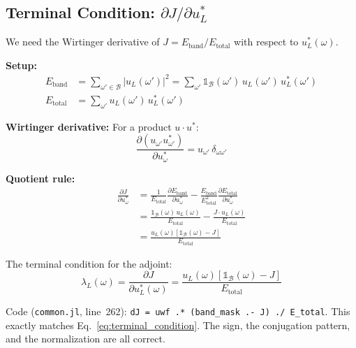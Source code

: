 \documentclass[12pt,a4paper]{article}
\newcommand{\pdv}[2]{\frac{\partial #1}{\partial #2}}
\theoremstyle{definition}
\begin{document}
\subsection{Terminal Condition: $\partial J / \partial u_L^*$}
\label{sec:terminal}

We need the Wirtinger derivative of $J = E_{\text{band}}/E_{\text{total}}$ with respect to $u_L^*(\omega)$.

\textbf{Setup:}
\begin{align}
E_{\text{band}} &= \sum_{\omega' \in \mathcal{B}} |u_L(\omega')|^2 = \sum_{\omega'} \mathbb{1}_\mathcal{B}(\omega')\, u_L(\omega')\, u_L^*(\omega') \\
E_{\text{total}} &= \sum_{\omega'} u_L(\omega')\, u_L^*(\omega')
\end{align}

\textbf{Wirtinger derivative:} For a product $u \cdot u^*$:
\begin{equation}
\pdv{(u_{\omega'}u_{\omega'}^*)}{u_\omega^*} = u_{\omega'}\,\delta_{\omega\omega'}
\end{equation}

\textbf{Quotient rule:}
\begin{align}
\pdv{J}{u_\omega^*} &= \frac{1}{E_{\text{total}}}\pdv{E_{\text{band}}}{u_\omega^*} - \frac{E_{\text{band}}}{E_{\text{total}}^2}\pdv{E_{\text{total}}}{u_\omega^*} \nonumber\\
&= \frac{\mathbb{1}_\mathcal{B}(\omega)\,u_L(\omega)}{E_{\text{total}}} - \frac{J\cdot u_L(\omega)}{E_{\text{total}}} \nonumber\\
&= \frac{u_L(\omega)\left[\mathbb{1}_\mathcal{B}(\omega) - J\right]}{E_{\text{total}}}
\end{align}

\begin{keyresult}
The terminal condition for the adjoint:
\begin{equation}
\boxed{\lambda_L(\omega) = \pdv{J}{u_L^*(\omega)} = \frac{u_L(\omega)\left[\mathbb{1}_\mathcal{B}(\omega) - J\right]}{E_{\text{total}}}}
\label{eq:terminal_condition}
\end{equation}
\end{keyresult}

\begin{verified}
Code (\texttt{common.jl}, line~262): \texttt{dJ = uwf .* (band\_mask .- J) ./ E\_total}. This exactly matches Eq.~\eqref{eq:terminal_condition}. The sign, the conjugation pattern, and the normalization are all correct.
\end{verified}
\end{document}
